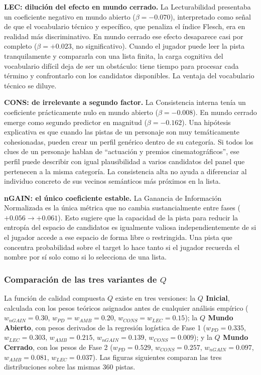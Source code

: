 \documentclass[../main.tex]{subfiles}
\begin{document}
\textbf{LEC: dilución del efecto en mundo cerrado.} La Lecturabilidad presentaba un coeficiente negativo en mundo abierto ($\beta = -0.070$), interpretado como señal de que el vocabulario técnico y específico, que penaliza el índice Flesch, era en realidad más discriminativo. En mundo cerrado ese efecto desaparece casi por completo ($\beta = +0.023$, no significativo). Cuando el jugador puede leer la pista tranquilamente y compararla con una lista finita, la carga cognitiva del vocabulario difícil deja de ser un obstáculo: tiene tiempo para procesar cada término y confrontarlo con los candidatos disponibles. La ventaja del vocabulario técnico se diluye.

\textbf{CONS: de irrelevante a segundo factor.} La Consistencia interna tenía un coeficiente prácticamente nulo en mundo abierto ($\beta = -0.008$). En mundo cerrado emerge como segundo predictor en magnitud ($\beta = -0.162$). Una hipótesis explicativa es que cuando las pistas de un personaje son muy temáticamente cohesionadas, pueden crear un perfil genérico dentro de su categoría. Si todos los clues de un personaje hablan de ``actuación y premios cinematográficos'', ese perfil puede describir con igual plausibilidad a varios candidatos del panel que pertenecen a la misma categoría. La consistencia alta no ayuda a diferenciar al individuo concreto de sus vecinos semánticos más próximos en la lista.

\textbf{nGAIN: el único coeficiente estable.} La Ganancia de Información Normalizada es la única métrica que no cambia sustancialmente entre fases ($+0.056 \rightarrow +0.061$). Esto sugiere que la capacidad de la pista para reducir la entropía del espacio de candidatos es igualmente valiosa independientemente de si el jugador accede a ese espacio de forma libre o restringida. Una pista que concentra probabilidad sobre el target lo hace tanto si el jugador recuerda el nombre por sí solo como si lo selecciona de una lista.

\subsubsection{Comparación de las tres variantes de $Q$}

La función de calidad compuesta $Q$ existe en tres versiones: la \textbf{$Q$ Inicial}, calculada con los pesos teóricos asignados antes de cualquier análisis empírico ($w_{nGAIN}=0.30$, $w_{PD}=w_{AMB}=0.20$, $w_{CONS}=w_{LEC}=0.15$); la \textbf{$Q$ Mundo Abierto}, con pesos derivados de la regresión logística de Fase 1 ($w_{PD}=0.335$, $w_{LEC}=0.303$, $w_{AMB}=0.215$, $w_{nGAIN}=0.139$, $w_{CONS}=0.009$); y la \textbf{$Q$ Mundo Cerrado}, con los pesos de Fase 2 ($w_{PD}=0.529$, $w_{CONS}=0.257$, $w_{nGAIN}=0.097$, $w_{AMB}=0.081$, $w_{LEC}=0.037$). Las figuras siguientes comparan las tres distribuciones sobre las mismas 360 pistas.
\end{document}
